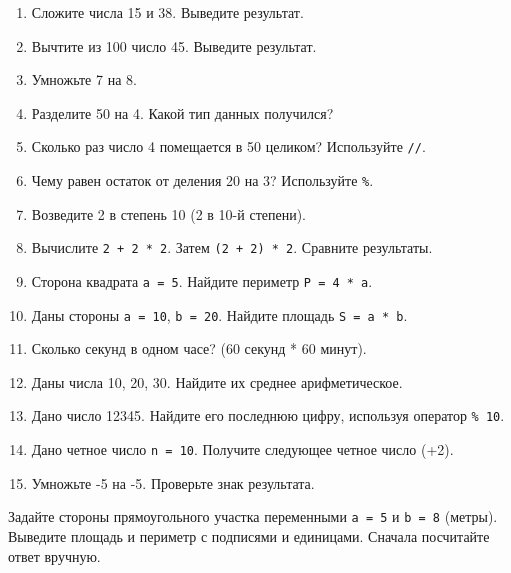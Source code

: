 \begin{enumerate}
    \item Сложите числа 15 и 38. Выведите результат.
    \item Вычтите из 100 число 45. Выведите результат.
    \item Умножьте 7 на 8.
    \item Разделите 50 на 4. Какой тип данных получился?
    \item Сколько раз число 4 помещается в 50 целиком? Используйте \texttt{//}.
    \item Чему равен остаток от деления 20 на 3? Используйте \texttt{\%}.
    \item Возведите 2 в степень 10 (2 в 10-й степени).
    \item Вычислите \texttt{2 + 2 * 2}. Затем \texttt{(2 + 2) * 2}. Сравните результаты.
    \item Сторона квадрата \texttt{a = 5}. Найдите периметр \texttt{P = 4 * a}.
    \item Даны стороны \texttt{a = 10}, \texttt{b = 20}. Найдите площадь \texttt{S = a * b}.
    \item Сколько секунд в одном часе? (60 секунд * 60 минут).
    \item Даны числа 10, 20, 30. Найдите их среднее арифметическое.
    \item Дано число 12345. Найдите его последнюю цифру, используя оператор \texttt{\% 10}.
    \item Дано четное число \texttt{n = 10}. Получите следующее четное число (+2).
    \item Умножьте -5 на -5. Проверьте знак результата.
\end{enumerate}

\begin{taskbox}[Калькулятор]
Задайте стороны прямоугольного участка переменными \texttt{a = 5} и \texttt{b = 8} (метры). Выведите площадь и периметр с подписями и единицами. Сначала посчитайте ответ вручную.
\end{taskbox}
